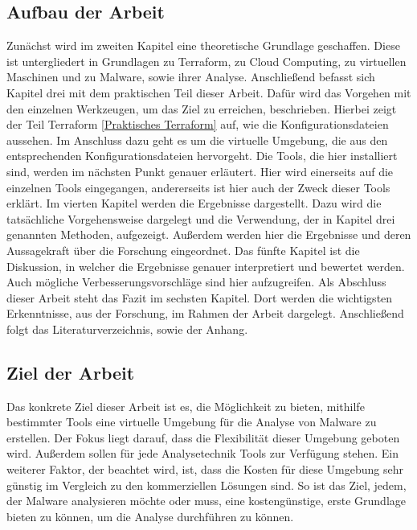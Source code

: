 \subsection{Aufbau der Arbeit}
Zunächst wird im zweiten Kapitel eine theoretische Grundlage geschaffen. Diese ist untergliedert in Grundlagen zu \dq Terraform\dq, zu Cloud Computing, zu virtuellen Maschinen und zu Malware, sowie ihrer Analyse. 
\newline Anschließend befasst sich Kapitel drei mit dem praktischen Teil dieser Arbeit. Dafür wird das Vorgehen mit den einzelnen Werkzeugen, um das Ziel zu erreichen, beschrieben. Hierbei zeigt der Teil Terraform \ref{Praktisches Terraform} auf, wie die Konfigurationsdateien aussehen. Im Anschluss dazu geht es um die virtuelle Umgebung, die aus den entsprechenden Konfigurationsdateien hervorgeht. Die Tools, die hier installiert sind, werden im nächsten Punkt genauer erläutert. Hier wird einerseits auf die einzelnen Tools eingegangen, andererseits ist hier auch der Zweck dieser Tools erklärt.
\newline
Im vierten Kapitel werden die Ergebnisse dargestellt. Dazu wird die tatsächliche Vorgehensweise dargelegt und die Verwendung, der in Kapitel drei genannten Methoden, aufgezeigt. Außerdem werden hier die Ergebnisse und deren Aussagekraft über die Forschung eingeordnet. 
\newline
Das fünfte Kapitel ist die Diskussion, in welcher die Ergebnisse genauer interpretiert und bewertet werden. Auch mögliche Verbesserungsvorschläge sind hier aufzugreifen.
\newline
Als Abschluss dieser Arbeit steht das Fazit im sechsten Kapitel. Dort werden die wichtigsten Erkenntnisse, aus der Forschung, im Rahmen der Arbeit dargelegt. Anschließend folgt das Literaturverzeichnis, sowie der Anhang.
\subsection{Ziel der Arbeit}
Das konkrete Ziel dieser Arbeit ist es, die Möglichkeit zu bieten, mithilfe bestimmter Tools eine virtuelle Umgebung für die Analyse von Malware zu erstellen. Der Fokus liegt darauf, dass die Flexibilität dieser Umgebung geboten wird. Außerdem sollen für jede Analysetechnik Tools zur Verfügung stehen. Ein weiterer Faktor, der beachtet wird, ist, dass die Kosten für diese Umgebung sehr günstig im Vergleich zu den kommerziellen Lösungen sind. So ist das Ziel, jedem, der Malware analysieren möchte oder muss, eine kostengünstige, erste Grundlage bieten zu können, um die Analyse durchführen zu können.